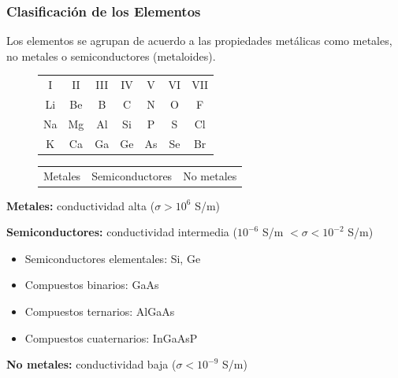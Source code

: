 \documentclass[10pt,t,aspectratio=169]{beamer}
\begin{document}
\begin{frame}[t]
\frametitle{Clasificación de los Elementos}

Los elementos se agrupan de acuerdo a las propiedades metálicas como metales, no metales o semiconductores (metaloides).

\begin{figure}[H]
    \centering
    \begin{tabular}{ccccccc}
        I   & II  & III & IV  & V   & VI  & VII \\
        \cellcolor{blue!25} Li  & \cellcolor{blue!25} Be  & \cellcolor{red!25} B   & \cellcolor{green!25} C   & \cellcolor{green!25} N   & \cellcolor{green!25} O   & \cellcolor{green!25} F   \\
        \cellcolor{blue!25} Na  & \cellcolor{blue!25} Mg  & \cellcolor{blue!25} Al  & \cellcolor{red!25} Si  & \cellcolor{green!25} P   & \cellcolor{green!25} S   & \cellcolor{green!25} Cl  \\
        \cellcolor{blue!25}K   & \cellcolor{blue!25}Ca  & \cellcolor{blue!25}Ga  & \cellcolor{red!25} Ge  & \cellcolor{red!25} As  & \cellcolor{green!25} Se  & \cellcolor{green!25} Br  \\
    \end{tabular}

    \vspace{3mm}
    \begin{tabular}{ccc}
      \cellcolor{blue!25}Metales & \cellcolor{red!25}Semiconductores & \cellcolor{green!25}No metales \\
    \end{tabular}
\end{figure}

\textbf{Metales:} conductividad alta ($\sigma > 10^{6}$  S/m)

\vspace{2mm}
\textbf{Semiconductores:} conductividad intermedia ($10^{-6}$ S/m $< \sigma < 10^{-2}$ S/m)

\begin{itemize}
  \item Semiconductores elementales: Si, Ge
  \item Compuestos binarios: GaAs
  \item Compuestos ternarios: AlGaAs
  \item Compuestos cuaternarios: InGaAsP
\end{itemize}

\vspace{2mm}
\textbf{No metales:} conductividad baja ($\sigma < 10^{-9}$ S/m)
\end{frame}
\end{document}

